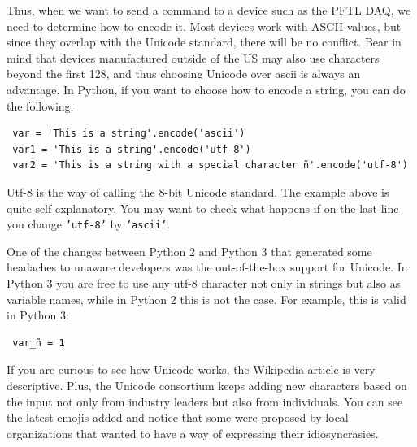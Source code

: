 Thus, when we want to send a command to a device such as the {PFTL DAQ}, we need to determine how to encode it. Most devices work with ASCII values, but since they overlap with the 
Unicode standard, there will be no conflict. Bear in mind that devices manufactured outside of the US may also use characters beyond the first 128, and thus choosing Unicode over ascii is always an advantage. In Python, if you want 
to choose how to encode a string, you can do the following:

\begin{verbatim}
 var = 'This is a string'.encode('ascii')
 var1 = 'This is a string'.encode('utf-8')
 var2 = 'This is a string with a special character ñ'.encode('utf-8')
\end{verbatim}

Utf-8 is the way of calling the 8-bit Unicode standard. The example above is quite self-explanatory. You may want to check what happens if on the last line you change \texttt{'utf-8'} by \texttt{'ascii'}. 

One of the changes between Python 2 and Python 3 that generated some headaches 
to unaware developers was the out-of-the-box support for Unicode. In Python 3 
you are free to use any utf-8 character not only in strings but also as 
variable names, while in Python 2 this is not the case. For example, this is 
valid in Python 3:

\begin{verbatim}
 var_ñ = 1
\end{verbatim}

If you are curious to see how Unicode works, the Wikipedia article is very descriptive. Plus, the Unicode consortium keeps adding new characters based on the input not only from industry leaders but also from individuals. You can see the latest emojis added and notice that some were proposed by local organizations that wanted to have a way of expressing their idiosyncrasies. 

